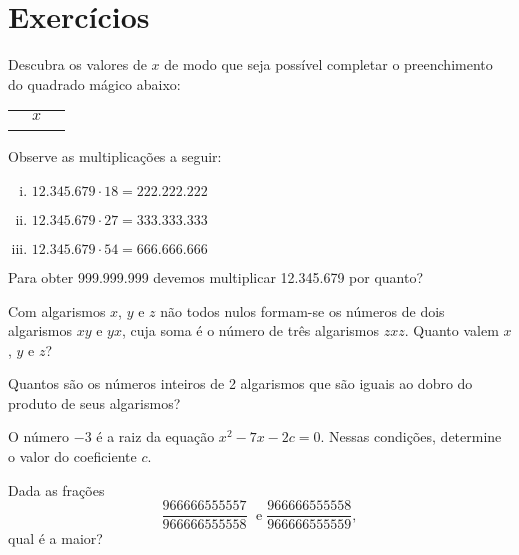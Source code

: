 \section{Exercícios}

\begin{exercise}
Descubra os valores de $x$ de modo que seja possível completar
o preenchimento do quadrado mágico abaixo:
\begin{center}
\begin{tabular}{|c|c|c|}
  \hline
   &   &  \\ \hline
    & $x$ &   \\ \hline
    &  &   \\
  \hline
\end{tabular}
\end{center}
\end{exercise}

\begin{exercise}
Observe as multiplicações a seguir:
\begin{enumerate}[i.]
  \item $12.345.679 \cdot 18 = 222.222.222$
  \item $12.345.679 \cdot 27 = 333.333.333$
  \item $12.345.679 \cdot 54 = 666.666.666$
\end{enumerate}
Para obter 999.999.999 devemos multiplicar 12.345.679 por quanto?
\end{exercise}

\begin{exercise}
Com algarismos $x$, $y$ e $z$ não todos nulos formam-se os
números de dois algarismos $xy$ e $yx$, cuja soma é o número de três
algarismos $zxz$. Quanto valem $x$, $y$ e $z$?
\end{exercise}

\begin{exercise}
Quantos são os números inteiros de 2 algarismos que são iguais
ao dobro do produto de seus algarismos?
\end{exercise}


\begin{exercise}
O número $-3$ é a raiz da equação $x^2 -7x -2c = 0$. Nessas
condições, determine o valor do coeficiente $c$.
\end{exercise}

\begin{exercise}
Dada as frações $$\frac{966666555557}{966666555558} \; \text{ e
} \; \frac{966666555558}{966666555559},$$ qual é a maior?
\end{exercise}


